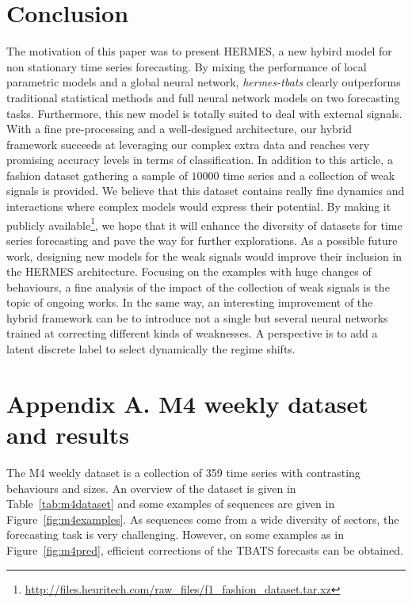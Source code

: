 \documentclass[review]{elsarticle}
\newcommand{\numberts}{10000}
\begin{document}
\section{Conclusion}
\label{sec:conclusion}
The motivation of this paper was to present HERMES, a new hybird model for non stationary time series forecasting. By mixing the performance of local parametric models and a global neural network, \textit{hermes-tbats} clearly outperforms traditional statistical methods and full neural network models on two forecasting tasks. Furthermore, this new model is totally suited to deal with external signals. With a fine pre-processing and a well-designed architecture, our hybrid framework succeeds at leveraging our complex extra data and reaches very promising accuracy levels in terms of classification. In addition to this article, a fashion dataset gathering a sample of $\numberts$ time series and a collection of weak signals is provided. We believe that this dataset contains really fine dynamics and interactions where complex models would express their potential. By making it publicly available\footnote[1]{\url{http://files.heuritech.com/raw_files/f1_fashion_dataset.tar.xz}}, we hope that it will enhance the diversity of datasets for time series forecasting and pave the way for further explorations.
As a possible future work, designing new models for the weak signals would improve their inclusion  in the HERMES architecture. Focusing on the examples with huge changes of behaviours, a fine analysis of the impact of the collection of weak signals is the topic of ongoing works. In the same way, an interesting improvement of the hybrid framework can be to introduce not a single but several neural networks trained at correcting different kinds of weaknesses. A perspective is to add a latent discrete label to select dynamically the regime shifts. 





\section*{Appendix A. M4 weekly dataset and results}
\label{sec:m4overview}


The M4 weekly dataset is a collection of 359 time series with  contrasting behaviours and sizes. An overview of the dataset is given in Table~\ref{tab:m4dataset} and some examples of sequences are given in Figure~\ref{fig:m4examples}. As sequences come from a wide diversity of sectors, the forecasting task is very challenging. However, on some examples as in Figure~\ref{fig:m4pred}, efficient corrections of the TBATS forecasts can be obtained.
\end{document}
